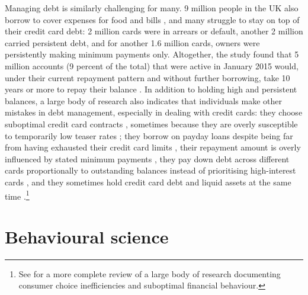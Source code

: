Managing debt is similarly challenging for many. 9 million people in the UK
also borrow to cover expenses for food and bills \citep{mps2018building}, and
many struggle to stay on top of their credit card debt: 2 million cards were in
arrears or default, another 2 million carried persistent debt, and for another
1.6 million cards, owners were persistently making minimum payments only.
Altogether, the study found that 5 million accounts (9 percent of the total)
that were active in January 2015 would, under their current repayment pattern
and without further borrowing, take 10 years or more to repay their balance
\citep{fca2016credit}. In addition to holding high and persistent balances, a
large body of research also indicates that individuals make other mistakes in
debt management, especially in dealing with credit cards: they choose
suboptimal credit card contracts \citep{agarwal2015consumers}, sometimes
because they are overly susceptible to temporarily low teaser rates
\citep{shui2004time, ausubel1991failure}; they borrow on payday loans despite
being far from having exhausted their credit card limits
\citep{agarwal2009payday}, their repayment amount is overly influenced by
stated minimum payments \citep{sakaguchi2022default}, they pay down debt across
different cards proportionally to outstanding balances instead of prioritising
high-interest cards \citep{gathergood2019individuals}, and they sometimes hold
credit card debt and liquid assets at the same time \citep{gross2002liquidity,
    gathergood2020co}.\footnote{See \citet{agarwal2017shapes} for a more
    complete review of a large body of research documenting consumer choice
inefficiencies and suboptimal financial behaviour.} 


\section{Behavioural science}%

